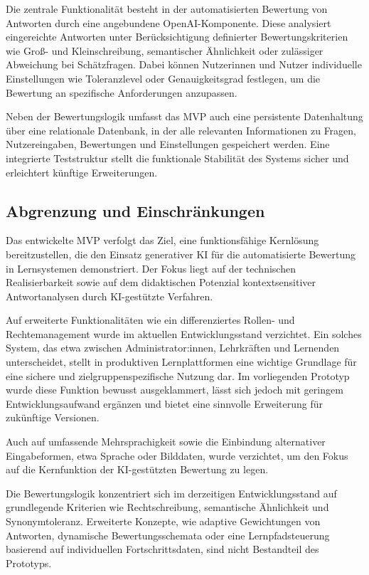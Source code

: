\documentclass[a4paper,12pt]{article}
\begin{document}
Die zentrale Funktionalität besteht in der automatisierten Bewertung von Antworten durch eine angebundene OpenAI-Komponente. Diese analysiert eingereichte Antworten unter Berücksichtigung definierter Bewertungskriterien wie Groß- und Kleinschreibung, semantischer Ähnlichkeit oder zulässiger Abweichung bei Schätzfragen. Dabei können Nutzerinnen und Nutzer individuelle Einstellungen wie Toleranzlevel oder Genauigkeitsgrad festlegen, um die Bewertung an spezifische Anforderungen anzupassen.

Neben der Bewertungslogik umfasst das MVP auch eine persistente Datenhaltung über eine relationale Datenbank, in der alle relevanten Informationen zu Fragen, Nutzereingaben, Bewertungen und Einstellungen gespeichert werden. Eine integrierte Teststruktur stellt die funktionale Stabilität des Systems sicher und erleichtert künftige Erweiterungen.

\subsection{Abgrenzung und Einschränkungen}
Das entwickelte MVP verfolgt das Ziel, eine funktionsfähige Kernlösung bereitzustellen, die den Einsatz generativer KI für die automatisierte Bewertung in Lernsystemen demonstriert. Der Fokus liegt auf der technischen Realisierbarkeit sowie auf dem didaktischen Potenzial kontextsensitiver Antwortanalysen durch KI-gestützte Verfahren.

Auf erweiterte Funktionalitäten wie ein differenziertes Rollen- und Rechtemanagement wurde im aktuellen Entwicklungsstand verzichtet. Ein solches System, das etwa zwischen Administrator:innen, Lehrkräften und Lernenden unterscheidet, stellt in produktiven Lernplattformen eine wichtige Grundlage für eine sichere und zielgruppenspezifische Nutzung dar. Im vorliegenden Prototyp wurde diese Funktion bewusst ausgeklammert, lässt sich jedoch mit geringem Entwicklungsaufwand ergänzen und bietet eine sinnvolle Erweiterung für zukünftige Versionen.

Auch auf umfassende Mehrsprachigkeit sowie die Einbindung alternativer Eingabeformen, etwa Sprache oder Bilddaten, wurde verzichtet, um den Fokus auf die Kernfunktion der KI-gestützten Bewertung zu legen.

Die Bewertungslogik konzentriert sich im derzeitigen Entwicklungsstand auf grundlegende Kriterien wie Rechtschreibung, semantische Ähnlichkeit und Synonymtoleranz. Erweiterte Konzepte, wie adaptive Gewichtungen von Antworten, dynamische Bewertungsschemata oder eine Lernpfadsteuerung basierend auf individuellen Fortschrittsdaten, sind nicht Bestandteil des Prototyps.
\end{document}
